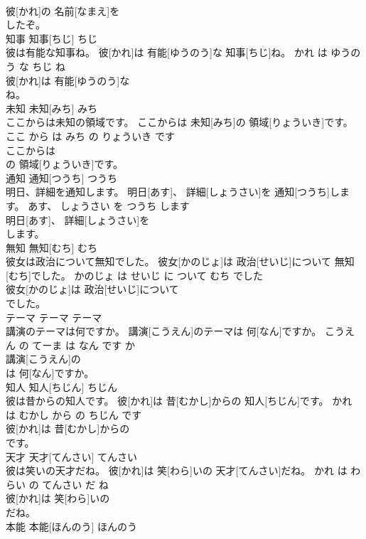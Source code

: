 \documentclass[8pt]{extreport}
\begin{document}
\begin{CJK}{UTF8}{min}
\\	彼[かれ]の 名前[なまえ]を
\\	したぞ。			
\\	知事	知事[ちじ]	ちじ	
\\	彼は有能な知事ね。	彼[かれ]は 有能[ゆうのう]な 知事[ちじ]ね。	かれ は ゆうのう な ちじ ね	
\\	彼[かれ]は 有能[ゆうのう]な
\\	ね。			
\\	未知	未知[みち]	みち	
\\	ここからは未知の領域です。	ここからは 未知[みち]の 領域[りょういき]です。	ここ から は みち の りょういき です	
\\	ここからは
\\	の 領域[りょういき]です。			
\\	通知	通知[つうち]	つうち	
\\	明日、詳細を通知します。	明日[あす]、 詳細[しょうさい]を 通知[つうち]します。	あす、 しょうさい を つうち します	
\\	明日[あす]、 詳細[しょうさい]を
\\	します。			
\\	無知	無知[むち]	むち	
\\	彼女は政治について無知でした。	彼女[かのじょ]は 政治[せいじ]について 無知[むち]でした。	かのじょ は せいじ に ついて むち でした	
\\	彼女[かのじょ]は 政治[せいじ]について
\\	でした。			
\\	テーマ	テーマ	テーマ	
\\	講演のテーマは何ですか。	講演[こうえん]のテーマは 何[なん]ですか。	こうえん の てーま は なん です か	
\\	講演[こうえん]の
\\	は 何[なん]ですか。			
\\	知人	知人[ちじん]	ちじん	
\\	彼は昔からの知人です。	彼[かれ]は 昔[むかし]からの 知人[ちじん]です。	かれ は むかし から の ちじん です	
\\	彼[かれ]は 昔[むかし]からの
\\	です。			
\\	天才	天才[てんさい]	てんさい	
\\	彼は笑いの天才だね。	彼[かれ]は 笑[わら]いの 天才[てんさい]だね。	かれ は わらい の てんさい だ ね	
\\	彼[かれ]は 笑[わら]いの
\\	だね。			
\\	本能	本能[ほんのう]	ほんのう	

\end{CJK}
\end{document}
